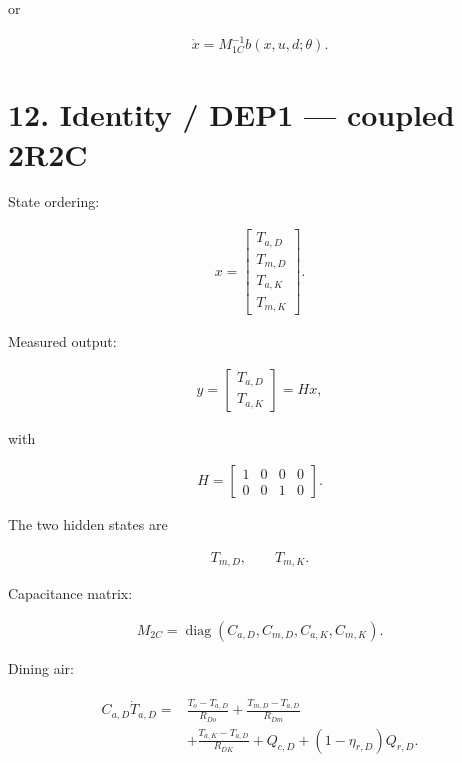 \documentclass[11pt]{article}
\begin{document}
or

\begin{align}
\boxed{
\dot x
=
M_{1C}^{-1}
b(x,u,d;\theta).
}
\tag{35}
\end{align}

\section*{12. Identity / DEP1 --- coupled 2R2C}

State ordering:

\begin{align}
\boxed{
x=
\begin{bmatrix}
T_{a,D}\\
T_{m,D}\\
T_{a,K}\\
T_{m,K}
\end{bmatrix}.
}
\tag{36}
\end{align}

Measured output:

\begin{align}
\boxed{
y=
\begin{bmatrix}
T_{a,D}\\
T_{a,K}
\end{bmatrix}
=
Hx,
}
\end{align}

with

\begin{align}
\boxed{
H=
\begin{bmatrix}
1&0&0&0\\
0&0&1&0
\end{bmatrix}.
}
\tag{37}
\end{align}

The two hidden states are

\begin{align}
T_{m,D},\qquad T_{m,K}.
\end{align}

Capacitance matrix:

\begin{align}
\boxed{
M_{2C}
=
\operatorname{diag}
(C_{a,D},C_{m,D},C_{a,K},C_{m,K}).
}
\tag{38}
\end{align}

Dining air:

\begin{align}
\boxed{
\begin{aligned}
C_{a,D}\dot T_{a,D}
={}&
\frac{T_o-T_{a,D}}{R_{Do}}
+
\frac{T_{m,D}-T_{a,D}}{R_{Dm}}\\
&+
\frac{T_{a,K}-T_{a,D}}{R_{DK}}
+
Q_{c,D}
+
(1-\eta_{r,D})Q_{r,D}.
\end{aligned}
}
\tag{39}
\end{align}
\end{document}
